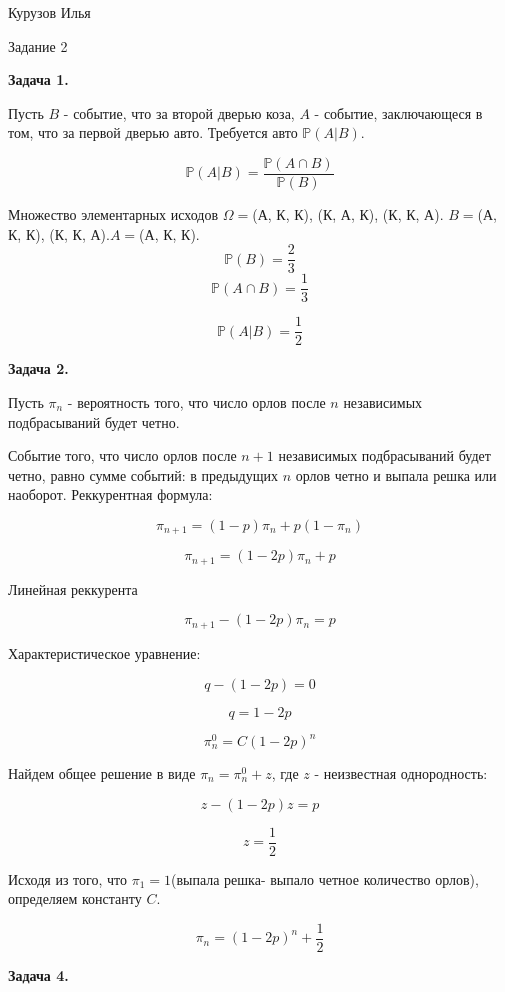 \documentclass[12pt]{article}
\begin{document}
\begin{center}
{Курузов Илья}

{Задание 2}
\end{center}

\begin{center}
\textbf{Задача 1.}
\end{center}

Пусть $B$ - событие, что за второй дверью коза, $A$ - событие, заключающеся в том, что за первой дверью авто. Требуется авто $\mathbb{P}(A|B)$.

$$\mathbb{P}(A|B)=\frac{\mathbb{P}(A\cap B)}{\mathbb{P}(B)}$$

Множество элементарных исходов $\Omega = $(А, К, К), (К, А, К), (К, К, А). $B = $(А, К, К), (К, К, А).$A =$(А, К, К).
$$\mathbb{P}(B)=\frac{2}{3}$$
$$\mathbb{P}(A\cap B)=\frac{1}{3}$$

$$\boxed{\mathbb{P}(A|B)=\frac{1}{2}}$$

\begin{center}
\textbf{Задача 2.}
\end{center}

Пусть $\pi_n$ - вероятность того, что число орлов после $n$ независимых подбрасываний будет четно.

Событие того, что число орлов после $n+1$ независимых подбрасываний будет четно, равно сумме событий: в предыдущих $n$ орлов четно и выпала решка или наоборот. Реккурентная формула:

$$\pi_{n+1} = (1-p)\pi_n+p(1-\pi_n)$$

$$\pi_{n+1} = (1-2p)\pi_n+p$$

Линейная реккурента

$$\pi_{n+1} - (1-2p)\pi_n = p$$

Характеристическое уравнение:

$$q -(1-2p)=0$$

$$q = 1-2p$$

$$\pi_n^0 = C(1-2p)^n$$

Найдем общее решение в виде $\pi_n=\pi_n^0+z$, где $z$ - неизвестная однородность:

$$z - (1 - 2p)z = p$$

$$z = \frac{1}{2}$$

Исходя из того, что $\pi_1 = 1$(выпала решка- выпало четное количество орлов), определяем константу $C$.

$$\boxed{\pi_n=(1-2p)^n+\frac{1}{2}}$$

\begin{center}
\textbf{Задача 4.}
\end{center}
\end{document}
